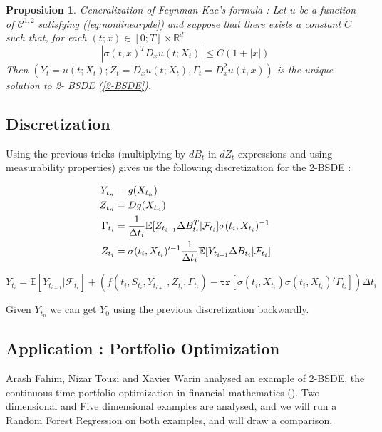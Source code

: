 \documentclass[english,11pt,openany]{article}
\theoremstyle{definition}
\theoremstyle{plain}
\newtheorem{Prop}[Th]{Proposition}
\theoremstyle{definition}
\begin{document}
	\begin{Prop}
		Generalization of Feynman-Kac's formula : \newline
		Let $u$ be a function of $\mathcal{C}^{1,2}$ satisfying (\ref{eq:nonlinearpde}) and suppose that there exists a
		constant $C$ such that, for each $(t; x) \in [0; T] \times \mathbb{R}^d$
		\begin{equation}
		|\sigma(t,x)^T D_xu(t;X_t)|\leq C(1 + |x|)
		\end{equation}
		Then $(Y_t = u(t;X_t);Z_t = D_xu(t;X_t), \Gamma_t = D^2_xu(t,x))$ is the unique solution to 2-
		BSDE (\ref{2-BSDE}).
	\end{Prop} 
	
	
	\subsection{Discretization}
	
	Using the previous tricks (multiplying by $dB_t$ in $dZ_t$ expressions and using measurability properties) gives us the following discretization for the 2-BSDE : 
	
	\begin{align}
	Y_{t_n} &= g(X_{t_n}) \notag \\
	Z_{t_n} &= Dg(X_{t_n}) \notag \\
	\Gamma_{t_i} &= \frac{1}{\Delta t_i}\mathbb{E}[Z_{t_{i + 1}} \Delta B_{t_i}^T  | \mathcal{F}_{t_i}]\sigma(t_i, X_{t_i})^{-1} \notag \\
	Z_{t_i} &= \sigma(t_i, X_{t_i})'^{-1}\frac{1}{\Delta t_i}\mathbb{E}[Y_{t_{i + 1}} \Delta B_{t_i}  | \mathcal{F}_{t_i}] \notag 
	\end{align}
	
	
	
	\begin{displaymath}
	Y_{t_i} = \mathbb{E}[Y_{t_{i + 1}} | \mathcal{F}_{t_i}] +  (f(t_i,S_{t_i}, Y_{t_{i + 1}}, Z_{t_i}, \Gamma_{t_i}) - \mathtt{tr}[\sigma(t_i, X_{t_i}) \sigma(t_i, X_{t_i})'\Gamma_{t_i}])\Delta t_i
	\end{displaymath}
	
	
	Given $Y_{t_n}$ we can get $Y_0$ using the previous discretization backwardly. 
	
	\subsection{Application : Portfolio Optimization}
	
	Arash Fahim, Nizar Touzi and Xavier Warin analysed an example of 2-BSDE, the continuous-time portfolio optimization in financial mathematics (\cite{touzi:2bsdesimulation}). 
	Two dimensional and Five dimensional examples are analysed, and we will run a Random Forest Regression on both examples, and will draw a comparison. 
	
\end{document}

